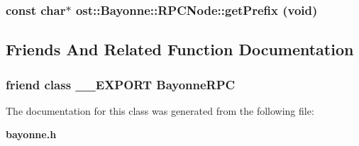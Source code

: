 \subsubsection[{getPrefix}]{\setlength{\rightskip}{0pt plus 5cm}const char$\ast$ ost::Bayonne::RPCNode::getPrefix (void)\hspace{0.3cm}{\ttfamily  [inline]}}\label{classost_1_1_bayonne_1_1_r_p_c_node_a379de395a9d073c9c6dff7ed724ab9ae}


\subsection{Friends And Related Function Documentation}
\subsubsection[{BayonneRPC}]{\setlength{\rightskip}{0pt plus 5cm}friend class \_\-\_\-EXPORT {\bf BayonneRPC}\hspace{0.3cm}{\ttfamily  [friend]}}\label{classost_1_1_bayonne_1_1_r_p_c_node_a9cf2c28828ee33dff859039767aab59c}


The documentation for this class was generated from the following file:\begin{DoxyCompactItemize}
\item 
{\bf bayonne.h}\end{DoxyCompactItemize}
